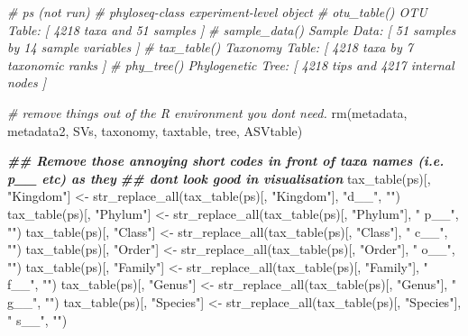 \documentclass[
]{book}
\newenvironment{Shaded}{\begin{snugshade}}{\end{snugshade}}
\newcommand{\CommentTok}[1]{\textcolor[rgb]{0.56,0.35,0.01}{\textit{#1}}}
\newcommand{\DocumentationTok}[1]{\textcolor[rgb]{0.56,0.35,0.01}{\textbf{\textit{#1}}}}
\newcommand{\FunctionTok}[1]{\textcolor[rgb]{0.00,0.00,0.00}{#1}}
\newcommand{\NormalTok}[1]{#1}
\newcommand{\OtherTok}[1]{\textcolor[rgb]{0.56,0.35,0.01}{#1}}
\newcommand{\StringTok}[1]{\textcolor[rgb]{0.31,0.60,0.02}{#1}}
\begin{document}
\begin{Shaded}
\begin{Highlighting}[]
\CommentTok{\# ps  (not run)}
\CommentTok{\# phyloseq{-}class experiment{-}level object}
\CommentTok{\# otu\_table()   OTU Table:         [ 4218 taxa and 51 samples ]}
\CommentTok{\# sample\_data() Sample Data:       [ 51 samples by 14 sample variables ]}
\CommentTok{\# tax\_table()   Taxonomy Table:    [ 4218 taxa by 7 taxonomic ranks ]}
\CommentTok{\# phy\_tree()    Phylogenetic Tree: [ 4218 tips and 4217 internal nodes ]}

\CommentTok{\# remove things out of the R environment you dont need. }
\FunctionTok{rm}\NormalTok{(metadata, metadata2, SVs, taxonomy, taxtable, tree, ASVtable)}

\DocumentationTok{\#\# Remove those annoying short codes in front of taxa names (i.e. p\_\_ etc) as they}
\DocumentationTok{\#\# dont look good in visualisation}
\FunctionTok{tax\_table}\NormalTok{(ps)[, }\StringTok{"Kingdom"}\NormalTok{] }\OtherTok{\textless{}{-}} \FunctionTok{str\_replace\_all}\NormalTok{(}\FunctionTok{tax\_table}\NormalTok{(ps)[, }\StringTok{"Kingdom"}\NormalTok{], }\StringTok{"d\_\_"}\NormalTok{, }\StringTok{""}\NormalTok{)}
\FunctionTok{tax\_table}\NormalTok{(ps)[, }\StringTok{"Phylum"}\NormalTok{] }\OtherTok{\textless{}{-}} \FunctionTok{str\_replace\_all}\NormalTok{(}\FunctionTok{tax\_table}\NormalTok{(ps)[, }\StringTok{"Phylum"}\NormalTok{], }\StringTok{" p\_\_"}\NormalTok{, }\StringTok{""}\NormalTok{)}
\FunctionTok{tax\_table}\NormalTok{(ps)[, }\StringTok{"Class"}\NormalTok{] }\OtherTok{\textless{}{-}} \FunctionTok{str\_replace\_all}\NormalTok{(}\FunctionTok{tax\_table}\NormalTok{(ps)[, }\StringTok{"Class"}\NormalTok{], }\StringTok{" c\_\_"}\NormalTok{, }\StringTok{""}\NormalTok{)}
\FunctionTok{tax\_table}\NormalTok{(ps)[, }\StringTok{"Order"}\NormalTok{] }\OtherTok{\textless{}{-}} \FunctionTok{str\_replace\_all}\NormalTok{(}\FunctionTok{tax\_table}\NormalTok{(ps)[, }\StringTok{"Order"}\NormalTok{], }\StringTok{" o\_\_"}\NormalTok{, }\StringTok{""}\NormalTok{)}
\FunctionTok{tax\_table}\NormalTok{(ps)[, }\StringTok{"Family"}\NormalTok{] }\OtherTok{\textless{}{-}} \FunctionTok{str\_replace\_all}\NormalTok{(}\FunctionTok{tax\_table}\NormalTok{(ps)[, }\StringTok{"Family"}\NormalTok{], }\StringTok{" f\_\_"}\NormalTok{, }\StringTok{""}\NormalTok{)}
\FunctionTok{tax\_table}\NormalTok{(ps)[, }\StringTok{"Genus"}\NormalTok{] }\OtherTok{\textless{}{-}} \FunctionTok{str\_replace\_all}\NormalTok{(}\FunctionTok{tax\_table}\NormalTok{(ps)[, }\StringTok{"Genus"}\NormalTok{], }\StringTok{" g\_\_"}\NormalTok{, }\StringTok{""}\NormalTok{)}
\FunctionTok{tax\_table}\NormalTok{(ps)[, }\StringTok{"Species"}\NormalTok{] }\OtherTok{\textless{}{-}} \FunctionTok{str\_replace\_all}\NormalTok{(}\FunctionTok{tax\_table}\NormalTok{(ps)[, }\StringTok{"Species"}\NormalTok{], }\StringTok{" s\_\_"}\NormalTok{, }\StringTok{""}\NormalTok{)}
\end{Highlighting}
\end{Shaded}
\end{document}

